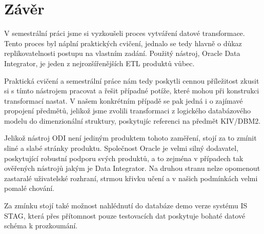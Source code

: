 \section{Závěr}

V semestrální práci jsme si vyzkoušeli proces vytváření datové transformace.
Tento proces byl náplní praktických cvičení, jednalo se tedy hlavně o důkaz replikovatelnosti postupu na vlastním zadání.
Použitý nástroj, Oracle Data Integrator, je jeden z nejrozšířenějších ETL produktů vůbec.

Praktická cvičení a semestrální práce nám tedy poskytli cennou příležitost zkusit si s tímto nástrojem pracovat a řešit případné potíže, které mohou při konstrukci transformací nastat.
V našem konkrétním případě se pak jedná i o zajímavé propojení předmětů, jelikož jsme zvolili transformaci z logického databázového modelu do dimenzionální struktury, poskytujíc referenci na předmět KIV/DBM2.

Jelikož nástroj ODI není jediným produktem tohoto zaměření, stojí za to zmínit sliné a slabé stránky produktu.
Společnost Oracle je velmi silný dodavatel, poskytující robustní podporu svých produktů, a to zejména v případech tak ověřených nástrojů jakým je Data Integrator.
Na druhou stranu nelze opomenout zastaralé uživatelské rozhraní, strmou křivku učení a v našich podmínkách velmi pomalé chování.

Za zmínku stojí také možnost nahlédnutí do databáze demo verze systému IS STAG, která přes přítomnost pouze testovacích dat poskytuje bohaté datové schéma k prozkoumání.
